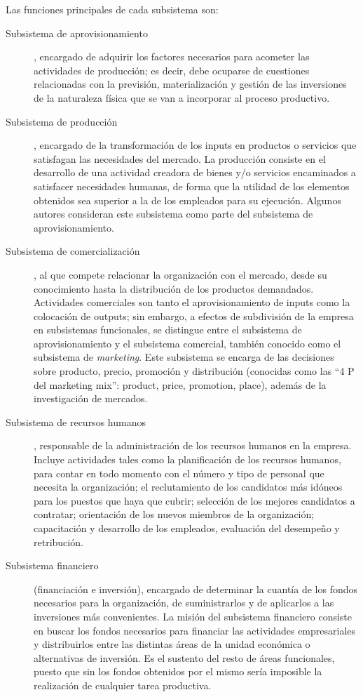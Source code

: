 \documentclass[12pt,a4paper,spanish]{report}
\begin{document}
			Las funciones principales de cada subsistema son:
			\begin{description}
				\item[Subsistema de aprovisionamiento], encargado de adquirir los factores necesarios para acometer las actividades de producción; es decir, debe ocuparse de cuestiones relacionadas con la previsión, materialización y gestión de las inversiones de la naturaleza física que se van a incorporar al proceso productivo.

				\item[Subsistema de producción], encargado de la transformación de los inputs en productos o servicios que satisfagan las necesidades del mercado. La producción consiste en el desarrollo de una actividad creadora de bienes y/o servicios encaminados a satisfacer necesidades humanas, de forma que la utilidad de los elementos obtenidos sea superior a la de los empleados para su ejecución. Algunos autores consideran este subsistema como parte del subsistema de aprovisionamiento.

				\item[Subsistema de comercialización], al que compete relacionar la organización con el mercado, desde su conocimiento hasta la distribución de los productos demandados. Actividades comerciales son tanto el aprovisionamiento de inputs como la colocación de outputs; sin embargo, a efectos de subdivisión de la empresa en subsistemas funcionales, se distingue entre el subsistema de aprovisionamiento y el subsistema comercial, también conocido como el subsistema de \textcolor[rgb]{0.5,0.8,0.9}{\emph{marketing}}. Este subsistema se encarga de las decisiones sobre producto, precio, promoción y distribución (conocidas como las ``4 P del marketing mix'': product, price, promotion, place), además de la investigación de mercados.

				\item[Subsistema de recursos humanos], responsable de la administración de los recursos humanos en la empresa. Incluye actividades tales como la planificación de los recursos humanos, para contar en todo momento con el número y tipo de personal que necesita la organización; el reclutamiento de los candidatos más idóneos para los puestos que haya que cubrir; selección de los mejores candidatos a contratar; orientación de los nuevos miembros de la organización; capacitación y desarrollo de los empleados, evaluación del desempeño y retribución.

				\item[Subsistema financiero] (financiación e inversión), encargado de determinar la cuantía de los fondos necesarios para la organización, de suministrarlos y de aplicarlos a las inversiones más convenientes. La misión del subsistema financiero consiste en buscar los fondos necesarios para financiar las actividades empresariales y distribuirlos entre las distintas áreas de la unidad económica o alternativas de inversión. Es el sustento del resto de áreas funcionales, puesto que sin los fondos obtenidos por el mismo sería imposible la realización de cualquier tarea productiva.


\end{description}
\end{document}
